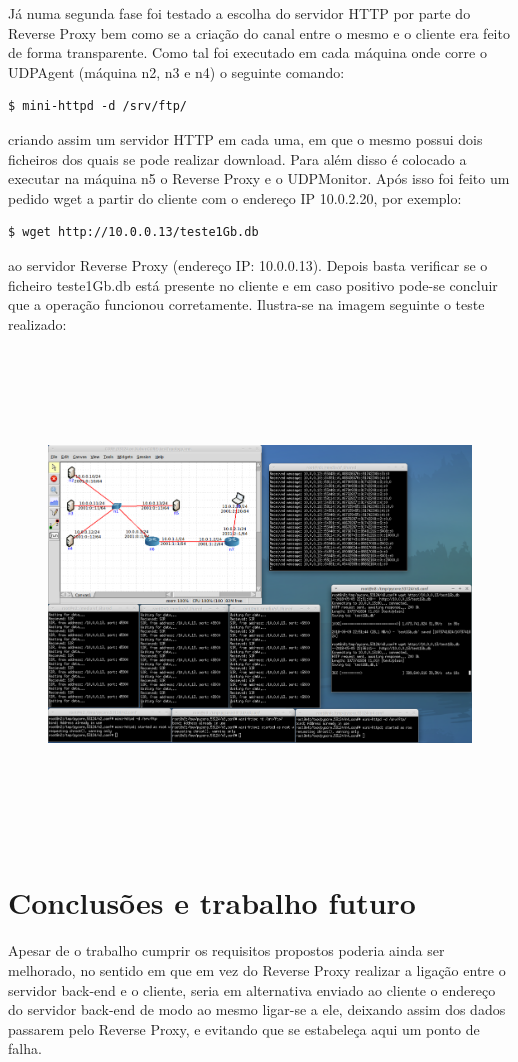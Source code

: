 \documentclass{article}
\begin{document}
Já numa segunda fase foi testado a escolha do servidor HTTP por parte do Reverse Proxy bem como se a criação do canal entre o mesmo e o cliente era feito de forma transparente.
Como tal foi executado em cada máquina onde corre o UDPAgent (máquina n2, n3 e n4) o seguinte comando:
\begin{verbatim}
$ mini-httpd -d /srv/ftp/
\end{verbatim}
criando assim um servidor HTTP em cada uma, em que o mesmo possui dois ficheiros dos quais se pode realizar download. Para além disso é colocado a executar na máquina n5 o Reverse Proxy e o UDPMonitor.
Após isso foi feito um pedido wget a partir do cliente com o endereço IP 10.0.2.20, por exemplo:
\begin{verbatim}
$ wget http://10.0.0.13/teste1Gb.db
\end{verbatim}
ao servidor Reverse Proxy (endereço IP: 10.0.0.13). Depois basta verificar se o ficheiro teste1Gb.db está presente no cliente e em caso positivo pode-se concluir que a operação funcionou corretamente. Ilustra-se na imagem seguinte o teste realizado:
\begin{figure}[H]
	\advance\leftskip-3cm
    \includegraphics[height=13cm]{teste2.png}
\end{figure}

\section{Conclusões e trabalho futuro}
Apesar de o trabalho cumprir os requisitos propostos poderia ainda ser melhorado, no sentido em que em vez do Reverse Proxy realizar a ligação entre o servidor back-end e o cliente, seria em alternativa enviado ao cliente o endereço do servidor back-end de modo ao mesmo ligar-se a ele, deixando assim dos dados passarem pelo Reverse Proxy, e evitando que se estabeleça aqui um ponto de falha.
\end{document}
